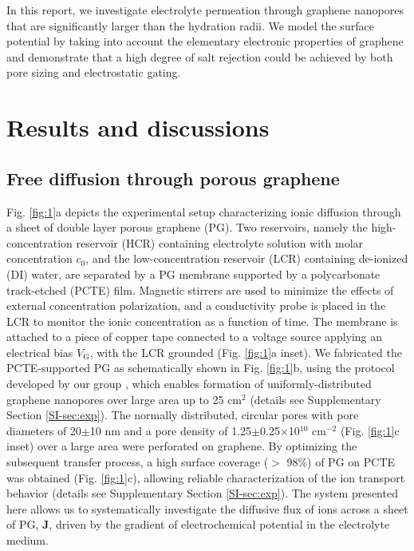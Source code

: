 \documentclass[journal=nalefd,email=true, hyperref=true, keywords=false]{achemso}
\newcommand{\Fig}{Fig.}
\begin{document}
In this report, we
investigate electrolyte permeation through graphene nanopores that are
significantly larger than the hydration radii. We model the surface
potential by taking into account the elementary electronic
properties of graphene and demonstrate that a high degree of salt
rejection could be achieved by both pore sizing and electrostatic gating.

\section{Results and discussions}
\label{sec:res}

\subsection{Free diffusion through porous graphene}
\label{sec:res-1}

\Fig{} \ref{fig:1}a depicts the experimental setup characterizing
ionic diffusion through a sheet of double layer porous graphene
(PG). Two reservoirs, namely the high-concentration reservoir (HCR)
containing electrolyte solution with molar concentration $c_0$, and
the low-concentration reservoir (LCR) containing de-ionized (DI)
water, are separated by a PG membrane supported by a polycarbonate
track-etched (PCTE) film. Magnetic stirrers are used to minimize the
effects of external concentration polarization, and a conductivity
probe is placed in the LCR to monitor the ionic concentration as a
function of time. The membrane is attached to a piece of copper tape
connected to a voltage source applying an electrical bias
$V_{\mathrm{G}}$, with the LCR grounded (\Fig{} \ref{fig:1}a
inset). We fabricated the PCTE-supported PG as schematically shown in
\Fig{} \ref{fig:1}b, using the protocol developed by our group
\cite{Choi_2018}, which enables formation of uniformly-distributed
graphene nanopores over large area up to 25 cm$^{2}$ (details see
Supplementary Section \ref{SI-sec:exp}). The normally distributed,
circular pores with pore diameters of 20$\pm$10 nm and a pore density
of 1.25$\pm$0.25$\times$10$^{10}$ cm$^{-2}$ (\Fig{} \ref{fig:1}c
inset) over a large area were perforated on graphene.  By optimizing
the subsequent transfer process, a high surface coverage ($>$ 98\%) of
PG on PCTE was obtained (\Fig{} \ref{fig:1}c), allowing reliable
characterization of the ion transport behavior (details see
Supplementary Section \ref{SI-sec:exp}).  The system presented here
allows us to systematically investigate the diffusive flux of ions
across a sheet of PG, $\boldsymbol{J}$, driven by the gradient of
electrochemical potential in the electrolyte medium.
\end{document}
